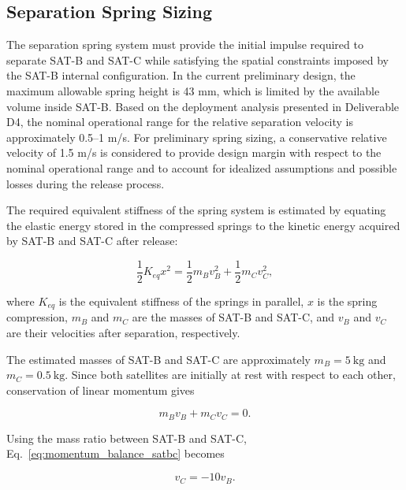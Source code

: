 \subsection{Separation Spring Sizing}
\label{sub:sep_spr_siz}

The separation spring system must provide the initial impulse required to separate SAT-B and SAT-C while satisfying the spatial constraints imposed by the SAT-B internal configuration. In the current preliminary design, the maximum allowable spring height is 43 mm, which is limited by the available volume inside SAT-B. Based on the deployment analysis presented in Deliverable D4, the nominal operational range for the relative separation velocity is approximately 0.5--1 m/s. For preliminary spring sizing, a conservative relative velocity of 1.5 m/s is considered to provide design margin with respect to the nominal operational range and to account for idealized assumptions and possible losses during the release process.

The required equivalent stiffness of the spring system is estimated by equating the elastic energy stored in the compressed springs to the kinetic energy acquired by SAT-B and SAT-C after release:

\begin{equation}
\frac{1}{2} K_{eq} x^2 =
\frac{1}{2} m_B v_B^2 +
\frac{1}{2} m_C v_C^2 ,
\label{eq:spring_energy_balance}
\end{equation}

where \(K_{eq}\) is the equivalent stiffness of the springs in parallel, \(x\) is the spring compression, \(m_B\) and \(m_C\) are the masses of SAT-B and SAT-C, and \(v_B\) and \(v_C\) are their velocities after separation, respectively.

The estimated masses of SAT-B and SAT-C are approximately \(m_B = 5~\mathrm{kg}\) and \(m_C = 0.5~\mathrm{kg}\). Since both satellites are initially at rest with respect to each other, conservation of linear momentum gives

\begin{equation}
m_B v_B + m_C v_C = 0 .
\label{eq:momentum_balance_satbc}
\end{equation}

Using the mass ratio between SAT-B and SAT-C, Eq.~\eqref{eq:momentum_balance_satbc} becomes

\begin{equation}
v_C = -10v_B .
\label{eq:velocity_mass_ratio}
\end{equation}

